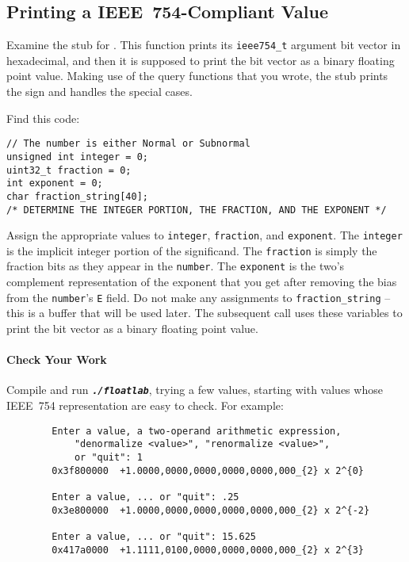 \subsection{Printing a IEEE~754-Compliant Value} \label{subsec:printing}

Examine the stub for .
This function prints its \lstinline{ieee754_t} argument bit vector in hexadecimal, and then it is supposed to print the bit vector as a binary floating point value.
Making use of the query functions that you wrote, the stub prints the sign and handles the special cases.

Find this code:

\begin{lstlisting}
// The number is either Normal or Subnormal
unsigned int integer = 0;
uint32_t fraction = 0;
int exponent = 0;
char fraction_string[40];
/* DETERMINE THE INTEGER PORTION, THE FRACTION, AND THE EXPONENT */
\end{lstlisting}

Assign the appropriate values to \lstinline{integer}, \lstinline{fraction}, and \lstinline{exponent}.
The \lstinline{integer} is the implicit integer portion of the significand.
The \lstinline{fraction} is simply the fraction bits as they appear in the \lstinline{number}.
The \lstinline{exponent} is the two's complement representation of the exponent that you get after removing the bias from the \lstinline{number}'s \texttt{E} field.
Do not make any assignments to \lstinline{fraction_string} -- this is a buffer that will be used later.
The subsequent  call uses these variables to print the bit vector as a binary floating point value.

\paragraph*{Check Your Work}

Compile and run \texttt{\textbf{\textit{./floatlab}}}, trying a few values, starting with values whose IEEE~754 representation are easy to check.
For example:

\begin{verbatim}
        Enter a value, a two-operand arithmetic expression,
            "denormalize <value>", "renormalize <value>",
            or "quit": 1
        0x3f800000	+1.0000,0000,0000,0000,0000,000_{2} x 2^{0}

        Enter a value, ... or "quit": .25
        0x3e800000	+1.0000,0000,0000,0000,0000,000_{2} x 2^{-2}

        Enter a value, ... or "quit": 15.625
        0x417a0000	+1.1111,0100,0000,0000,0000,000_{2} x 2^{3}
\end{verbatim}

